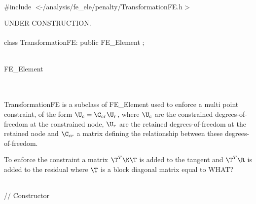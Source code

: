 
   \\
\#include $<\tilde{ }$/analysis/fe\_ele/penalty/TransformationFE.h$>$  


UNDER CONSTRUCTION. \\

  \\
class TransformationFE: public FE\_Element ;  


  \\
FE\_Element 

\indent{} \\ 

  \\
\indent TransformationFE is a subclass of FE\_Element used to enforce a
multi point constraint, of the form $\U_c = \C_{cr} \U_r$, where $\U_c$ are
the constrained degrees-of-freedom at the constrained node, $\U_r$ are
the retained degrees-of-freedom at the retained node and $\C_{cr}$ a
matrix defining the relationship between these degrees-of-freedom. 

To enforce the constraint a matrix $\T^T \K \T$ is added to the
tangent and $\T^T \R$ is added to the residual where $\T$ is a block
diagonal matrix equal to WHAT?


  \\
// Constructor  

